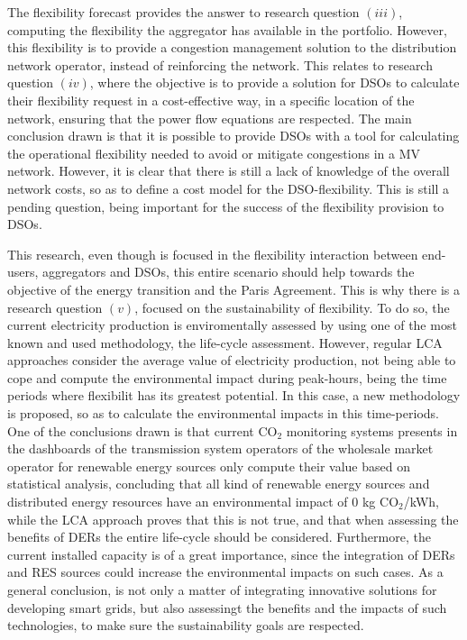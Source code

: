The flexibility forecast provides the answer to research question $(iii)$, computing the flexibility the aggregator has available in the portfolio. However, this flexibility is to provide a congestion management solution to the distribution network operator, instead of reinforcing the network. This relates to research question $(iv)$, where the objective is to provide a solution for DSOs to calculate their flexibility request in a cost-effective way, in a specific location of the network, ensuring that the power flow equations are respected. The main conclusion drawn is that it is possible to provide DSOs with a tool for calculating the operational flexibility needed to avoid or mitigate congestions in a MV network. However, it is clear that there is still a lack of knowledge of the overall network costs, so as to define a cost model for the DSO-flexibility. This is still a pending question, being important for the success of the flexibility provision to DSOs. 

This research, even though is focused in the flexibility interaction between end-users, aggregators and DSOs, this entire scenario should help towards the objective of the energy transition and the Paris Agreement. This is why there is a research question $(v)$, focused on the sustainability of flexibility. To do so, the current electricity production is enviromentally assessed by using one of the most known and used methodology, the life-cycle assessment. However, regular LCA approaches consider the average value of electricity production, not being able to cope and compute the environmental impact during peak-hours, being the time periods where flexibilit has its greatest potential. In this case, a new methodology is proposed, so as to calculate the environmental impacts in this time-periods. One of the conclusions drawn is that current CO$_2$ monitoring systems presents in the dashboards of the transmission system operators of the wholesale market operator for renewable energy sources only compute their value based on statistical analysis, concluding that all kind of renewable energy sources and distributed energy resources have an environmental impact of 0 kg CO$_2$/kWh, while the LCA approach proves that this is not true, and that when assessing the benefits of DERs the entire life-cycle should be considered. Furthermore, the current installed capacity is of a great importance, since the integration of DERs and RES sources could increase the environmental impacts on such cases. As a general conclusion, is not only a matter of integrating innovative solutions for developing smart grids, but also assessingt the benefits and the impacts of such technologies, to make sure the sustainability goals are respected. 


